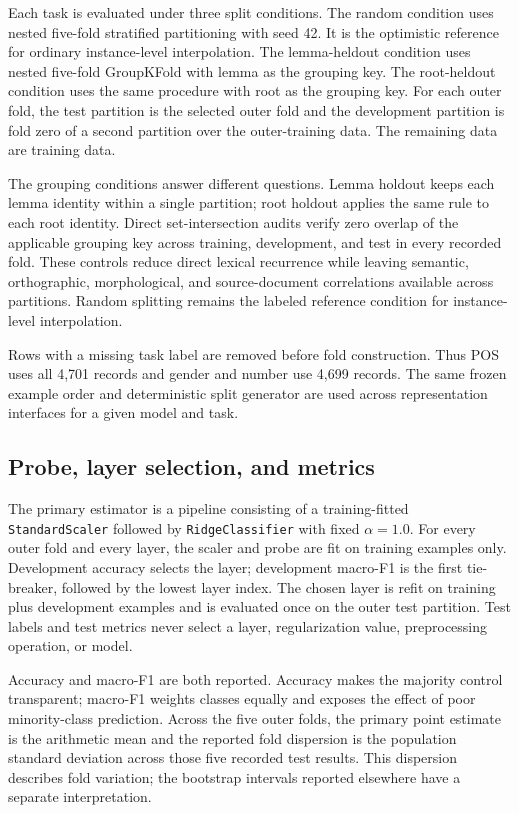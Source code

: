 \documentclass[pdflatex,sn-basic]{sn-jnl}
\begin{document}
Each task is evaluated under three split conditions. The random condition
uses nested five-fold stratified partitioning with seed 42. It is the
optimistic reference for ordinary instance-level interpolation. The
lemma-heldout condition uses nested five-fold GroupKFold with lemma as the
grouping key. The root-heldout condition uses the same procedure with root as
the grouping key. For each outer fold, the test partition is the selected
outer fold and the development partition is fold zero of a second partition
over the outer-training data. The remaining data are training data.

The grouping conditions answer different questions. Lemma holdout keeps each
lemma identity within a single partition; root holdout applies the same rule
to each root identity. Direct set-intersection audits verify zero overlap of
the applicable grouping key across training, development, and test in every
recorded fold. These controls reduce direct lexical recurrence while leaving
semantic, orthographic, morphological, and source-document correlations
available across partitions. Random splitting remains the labeled reference
condition for instance-level interpolation.

Rows with a missing task label are removed before fold construction. Thus POS
uses all 4,701 records and gender and number use 4,699 records. The same
frozen example order and deterministic split generator are used across
representation interfaces for a given model and task.

\subsection{Probe, layer selection, and metrics}

The primary estimator is a pipeline consisting of a training-fitted
\texttt{StandardScaler} followed by \texttt{RidgeClassifier} with fixed
$\alpha=1.0$. For every outer fold and every layer, the scaler and probe are
fit on training examples only. Development accuracy selects the layer;
development macro-F1 is the first tie-breaker, followed by the lowest layer
index. The chosen layer is refit on training plus development examples and is
evaluated once on the outer test partition. Test labels and test metrics never
select a layer, regularization value, preprocessing operation, or model.

Accuracy and macro-F1 are both reported. Accuracy makes the majority control
transparent; macro-F1 weights classes equally and exposes the effect of poor
minority-class prediction. Across the five outer folds, the primary point
estimate is the arithmetic mean and the reported fold dispersion is the
population standard deviation across those five recorded test results. This
dispersion describes fold variation; the bootstrap intervals reported
elsewhere have a separate interpretation.
\end{document}
